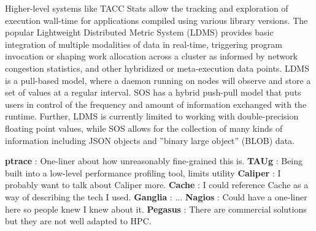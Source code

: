 Higher-level systems like TACC Stats \cite{evans2014comprehensive}
allow the tracking and exploration of execution wall-time for
applications compiled using various library versions.
%
The popular Lightweight Distributed Metric System (LDMS)
\cite{agelastos2014lightweight} provides basic integration of multiple
modalities of data in real-time, triggering program invocation or
shaping work allocation across a cluster as informed by network
congestion statistics, and other hybridized or meta-execution data
points.
%
LDMS is a pull-based model, where a daemon running on nodes will
observe and store a set of values at a regular interval.
%
SOS has a hybrid push-pull model that puts users in control of the
frequency and amount of information exchanged with the runtime.
%
Further, LDMS is currently limited to working with double-precision
floating point values, while SOS allows for the collection of many
kinds of information including JSON objects and ''binary large
object'' (BLOB) data.


\textbf{ptrace} : One-liner about how unreasonably fine-grained this is.
\textbf{TAUg} : Being built into a low-level performance profiling tool, limits utility
\textbf{Caliper} : I probably want to talk about Caliper more.
\textbf{Cache} : I could reference Cache as a way of describing the tech I used.
\textbf{Ganglia} : ...
\textbf{Nagios} : Could have a one-liner here so people knew I knew about it.
\textbf{Pegasus} : There are commercial solutions but they are not well adapted to HPC.







